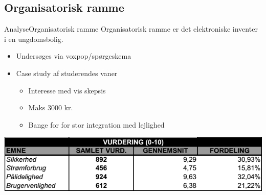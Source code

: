 \subsection{Organisatorisk ramme}
\begin{frame}{Analyse}{Organisatorisk ramme}
Organisatorisk ramme er det elektroniske inventer i en ungdomsbolig.
\begin{itemize}
\item Undersøges via voxpop/spørgeskema
\item Case study af studerendes vaner
\begin{itemize}
\item Interesse med vis skepsis
\item Maks 3000 kr.
\item Bange for for stor integration med lejlighed
\end{itemize}
\end{itemize}
\includegraphics[scale=0.5]{contens/spgskema.png}
\end{frame}